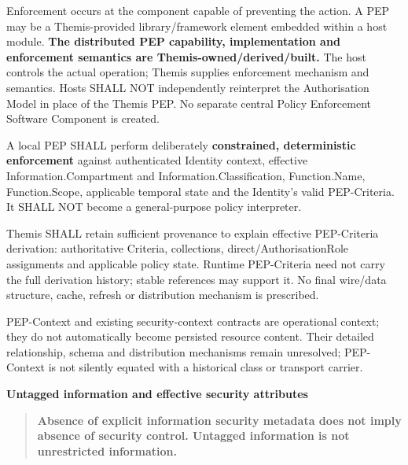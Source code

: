 Enforcement occurs at the component capable of preventing the action. A PEP may
be a Themis-provided library/framework element embedded within a host module.
\textbf{The distributed PEP capability, implementation and enforcement semantics are
Themis-owned/derived/built.} The host controls the actual operation; Themis
supplies enforcement mechanism and semantics. Hosts SHALL NOT independently
reinterpret the Authorisation Model in place of the Themis PEP. No separate
central Policy Enforcement Software Component is created.



A local PEP SHALL perform deliberately \textbf{constrained, deterministic enforcement}
against authenticated Identity context, effective Information.Compartment and
Information.Classification, Function.Name, Function.Scope, applicable temporal
state and the Identity's valid PEP-Criteria. It SHALL NOT become a general-purpose
policy interpreter.



Themis SHALL retain sufficient provenance to explain effective PEP-Criteria
derivation: authoritative Criteria, collections, direct/AuthorisationRole
assignments and applicable policy state. Runtime PEP-Criteria need not carry
the full derivation history; stable references may support it. No final wire/data
structure, cache, refresh or distribution mechanism is prescribed.



PEP-Context and existing security-context contracts are operational context;
they do not automatically become persisted resource content. Their detailed
relationship, schema and distribution mechanisms remain unresolved;
PEP-Context is not silently equated with a historical class or transport carrier.







\par\medskip\textbf{Untagged information and effective security attributes}\par


\begin{quote}


\textbf{Absence of explicit information security metadata does not imply absence
of security control. Untagged information is not unrestricted information.}



\end{quote}


